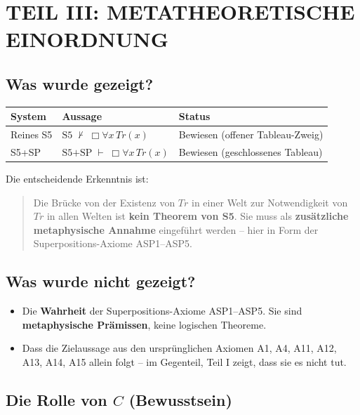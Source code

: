 \documentclass[
]{article}
\begin{document}
\section{TEIL III: METATHEORETISCHE EINORDNUNG}

\subsection{Was wurde gezeigt?}

\begin{table}[h]
\centering
\begin{tabular}{lll}
\toprule
\textbf{System} & \textbf{Aussage} & \textbf{Status} \\
\midrule
Reines S5 & \(\text{S5} \;\not\vdash\; \Box\forall x\,Tr(x)\) & Bewiesen (offener Tableau-Zweig) \\
S5+SP & \(\text{S5+SP} \;\vdash\; \Box\forall x\,Tr(x)\) & Bewiesen (geschlossenes Tableau) \\
\bottomrule
\end{tabular}
\end{table}

Die entscheidende Erkenntnis ist:

\begin{quote}
Die Brücke von der Existenz von \(Tr\) in einer Welt zur Notwendigkeit von \(Tr\) in allen Welten ist \textbf{kein Theorem von S5}. Sie muss als \textbf{zusätzliche metaphysische Annahme} eingeführt werden – hier in Form der Superpositions-Axiome ASP1–ASP5.
\end{quote}

\subsection{Was wurde nicht gezeigt?}

\begin{itemize}
\item Die \textbf{Wahrheit} der Superpositions-Axiome ASP1–ASP5. Sie sind \textbf{metaphysische Prämissen}, keine logischen Theoreme.
\item Dass die Zielaussage aus den ursprünglichen Axiomen A1, A4, A11, A12, A13, A14, A15 allein folgt – im Gegenteil, Teil I zeigt, dass sie es nicht tut.
\end{itemize}

\subsection{Die Rolle von \(C\) (Bewusstsein)}
\end{document}
